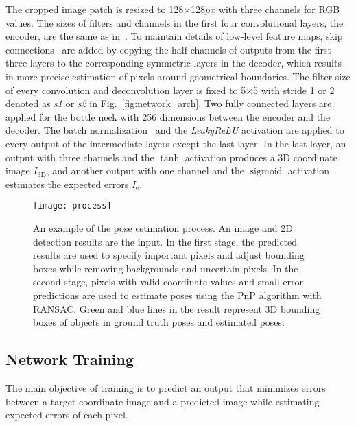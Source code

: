 \documentclass[10pt,twocolumn,letterpaper]{article}
\begin{document}
 The cropped image patch is resized to 128$\times$128$px$ with three channels for RGB values. The sizes of filters and channels in the first four convolutional layers, the encoder, are the same as in~\cite{Sundermeyer_2018_ECCV_implicit}. To maintain details of low-level feature maps, skip connections~\cite{ronneberger2015u_unet} are added by copying the half channels of outputs from the first three layers to the corresponding symmetric layers in the decoder, which results in more precise estimation of pixels around geometrical boundaries. The filter size of every convolution and deconvolution layer is fixed to 5$\times$5 with stride 1 or 2 denoted as \textit{s1} or \textit{s2} in Fig.~\ref{fig:network_arch}. Two fully connected layers are applied for the bottle neck with 256 dimensions between the encoder and the decoder. The batch normalization~\cite{ioffe2015batchnorm} and the \textit{LeakyReLU} activation are applied to every output of the intermediate layers except the last layer. In the last layer, an output with three channels and the $\tanh$ activation produces a 3D coordinate image $I_\textrm{3D}$, and another output with one channel and the $\operatorname{sigmoid}$ activation estimates the expected errors $I_\textrm{e}$.

\begin{figure*}
\begin{center}
   \def\svgwidth{\linewidth}
\texttt{[image: process]} 
\end{center}
\vspace{-5pt}
   \caption{An example of the pose estimation process. An image and 2D detection results are the input. In the first stage, the predicted results are used to specify important pixels and adjust bounding boxes while removing backgrounds and uncertain pixels. In the second stage, pixels with valid coordinate values and small error predictions are used to estimate poses using the PnP algorithm with RANSAC. Green and blue lines in the result represent 3D bounding boxes of objects in ground truth poses and estimated poses.
   }
\label{fig:detection_process}
\end{figure*}
\subsection{Network Training}


The main objective of training is to predict an output that minimizes errors between a target coordinate image and a predicted image while estimating expected errors of each pixel.
\end{document}
